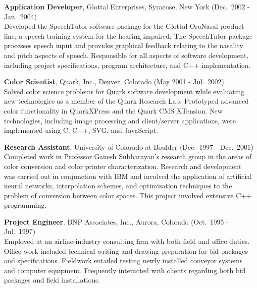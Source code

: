 \begin{minipage}{\minipagewidth}
\textbf{Application Developer}, Glottal Enterprises, Syracuse, New York (Dec.~2002 - Jan.~2004) \\
%
Developed the SpeechTutor software package for the Glottal OroNasal
product line, a speech-training system for the hearing impaired.  The
SpeechTutor package processes speech input and provides graphical
feedback relating to the nasality and pitch aspects of speech.
Responsible for all aspects of software development, including project
specifications, program architecture, and C++ implementation.
\end{minipage}\vspace{\parskip}

\begin{minipage}{\minipagewidth}
\textbf{Color Scientist}, Quark, Inc., Denver, Colorado (May 2001 - Jul.~2002) \\
%
Solved color science problems for Quark software development while
evaluating new technologies as a member of the Quark Research
Lab. Prototyped advanced color functionality in QuarkXPress and the
Quark CMS XTension. New technologies, including image processing and
client/server applications, were implemented using C, C++, SVG, and
JavaScript.
\end{minipage}\vspace{\parskip}

\begin{minipage}{\minipagewidth}
\textbf{Research Assistant}, University of Colorado at Boulder (Dec.~1997 - Dec.~2001) \\
%
Completed work in Professor Ganesh Subbarayan's research group in the
areas of color conversion and color printer characterization. Research and development
was carried out in conjunction with IBM and involved the application
of artificial neural networks, interpolation schemes, and optimization
techniques to the problem of conversion between color spaces.
This project involved extensive C++ programming.
\end{minipage}\vspace{\parskip}


\begin{minipage}{\minipagewidth}
\textbf{Project Engineer}, BNP Associates, Inc., Aurora, Colorado (Oct.~1995 - Jul.~1997) \\
%
Employed at an airline-industry consulting firm with both field and
office duties. Office work included technical writing and drawing
preparation for bid packages and specifications.  Fieldwork entailed
testing newly installed conveyor systems and computer
equipment. Frequently interacted with clients regarding both bid
packages and field installations.
\end{minipage}\vspace{\parskip}

